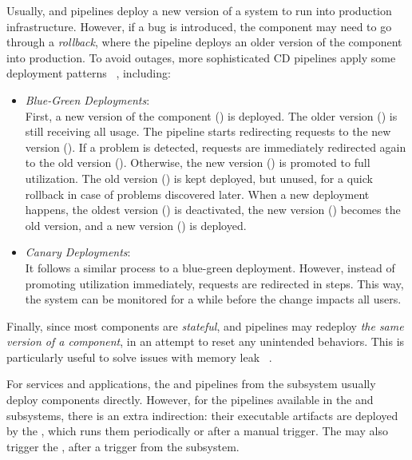   Usually,  and 
  pipelines deploy a new version of a system to run into production
  infrastructure. However, if a bug is introduced, the component may
  need to go through a \emph{rollback}, where the pipeline deploys an
  older version of the component into production. To avoid outages,
  more sophisticated CD pipelines apply some deployment patterns%
  ~\parencite{Davis2019CloudPatterns}, including:
  \begin{itemize}
    \item \emph{Blue-Green Deployments}: \\
          First, a new version of the component (\ColorBlue) is deployed.
          The older version (\ColorGreen) is still receiving all usage.
          The pipeline starts redirecting requests to the new version
          (\ColorBlue).
          If a problem is detected, requests are immediately redirected
          again to the old version (\ColorGreen).
          Otherwise, the new version (\ColorBlue) is promoted to full
          utilization.
          The old version (\ColorGreen) is kept deployed, but unused,
          for a quick rollback in case of problems discovered later.
          When a new deployment happens, the oldest version (\ColorGreen)
          is deactivated, the new version (\ColorBlue) becomes the old version,
          and a new version (\ColorGreen) is deployed.
    \item \emph{Canary Deployments}: \\
          It follows a similar process to a blue-green deployment.
          However, instead of promoting utilization immediately,
          requests are redirected in steps. This way, the system can
          be monitored for a while before the change impacts all users.
  \end{itemize}

  Finally, since most components are \emph{stateful}, 
  and  pipelines may redeploy \emph{the same version
  of a component}, in an attempt to reset any unintended behaviors. This is
  particularly useful to solve issues with memory leak%
  ~\parencite{Davis2019CloudPatterns}.

  For services and applications, the  and
   pipelines from the  
  subsystem usually deploy components directly. However, for the pipelines
  available in the  and 
  subsystems, there is an extra indirection: their executable artifacts are
  deployed by the , which runs them
  periodically or after a manual trigger.
  The  may also trigger the
  , after a trigger from the
   subsystem.

